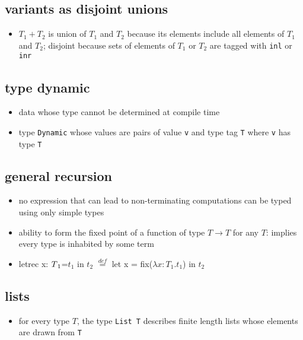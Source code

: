 \documentclass[11pt]{article}
\begin{document}
\subsection{variants as disjoint unions}
\label{sec:org9e1be6f}
\begin{itemize}
\item \(T_1 + T_2\) is union of \(T_1\) and \(T_2\) because its elements include all elements of \(T_1\) and \(T_2\); disjoint because sets of elements of \(T_1\) or \(T_2\) are tagged with \texttt{inl} or \texttt{inr}
\end{itemize}

\subsection{type dynamic}
\label{sec:org9629e5c}
\begin{itemize}
\item data whose type cannot be determined at compile time
\item type \texttt{Dynamic} whose values are pairs of value \texttt{v} and type tag \texttt{T} where \texttt{v} has type \texttt{T}
\end{itemize}

\subsection{general recursion}
\label{sec:orgc949956}
\begin{itemize}
\item no expression that can lead to non-terminating computations can be typed using only simple types
\item ability to form the fixed point of a function of type \(T \rightarrow T\) for any \(T\): implies every type is inhabited by some term
\item letrec x: $T\textsubscript{1}$=\(t_1\) in \(t_2\) $\stackrel{def}{=}$ let x = fix(\(\lambda x : T_1.t_1\)) in \(t_2\)
\end{itemize}

\subsection{lists}
\label{sec:org19e7d0a}
\begin{itemize}
\item for every type \(T\), the type \texttt{List T} describes finite length lists whose elements are drawn from \texttt{T}
\end{itemize}
\end{document}
